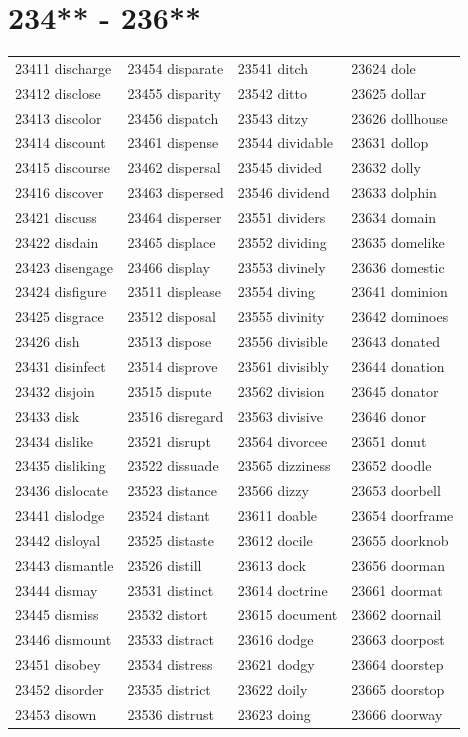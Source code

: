 \documentclass[10pt, oneside]{book}
\begin{document}
\begin{table}
	\centering
	\section*{234** - 236**}
	\begin{tabular}{l l l l}
23411 discharge &23454 disparate &23541 ditch &23624 dole\\
23412 disclose &23455 disparity &23542 ditto &23625 dollar\\
23413 discolor &23456 dispatch &23543 ditzy &23626 dollhouse\\
23414 discount &23461 dispense &23544 dividable &23631 dollop\\
23415 discourse &23462 dispersal &23545 divided &23632 dolly\\
23416 discover &23463 dispersed &23546 dividend &23633 dolphin\\
23421 discuss &23464 disperser &23551 dividers &23634 domain\\
23422 disdain &23465 displace &23552 dividing &23635 domelike\\
23423 disengage &23466 display &23553 divinely &23636 domestic\\
23424 disfigure &23511 displease &23554 diving &23641 dominion\\
23425 disgrace &23512 disposal &23555 divinity &23642 dominoes\\
23426 dish &23513 dispose &23556 divisible &23643 donated\\
23431 disinfect &23514 disprove &23561 divisibly &23644 donation\\
23432 disjoin &23515 dispute &23562 division &23645 donator\\
23433 disk &23516 disregard &23563 divisive &23646 donor\\
23434 dislike &23521 disrupt &23564 divorcee &23651 donut\\
23435 disliking &23522 dissuade &23565 dizziness &23652 doodle\\
23436 dislocate &23523 distance &23566 dizzy &23653 doorbell\\
23441 dislodge &23524 distant &23611 doable &23654 doorframe\\
23442 disloyal &23525 distaste &23612 docile &23655 doorknob\\
23443 dismantle &23526 distill &23613 dock &23656 doorman\\
23444 dismay &23531 distinct &23614 doctrine &23661 doormat\\
23445 dismiss &23532 distort &23615 document &23662 doornail\\
23446 dismount &23533 distract &23616 dodge &23663 doorpost\\
23451 disobey &23534 distress &23621 dodgy &23664 doorstep\\
23452 disorder &23535 district &23622 doily &23665 doorstop\\
23453 disown &23536 distrust &23623 doing &23666 doorway\\
	\end{tabular}
 \end{table}
\clearpage
\end{document}
